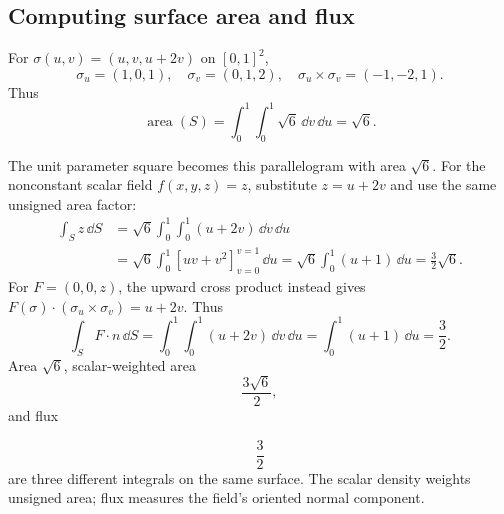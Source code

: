 \subsection{Computing surface area and flux}
\begin{center}
\end{center}
\begin{example}
For $\sigma(u,v)=(u,v,u+2v)$ on $[0,1]^2$,
\[
\sigma_u=(1,0,1),\quad \sigma_v=(0,1,2),\quad
\sigma_u\times\sigma_v=(-1,-2,1).
\]
Thus
\[
\operatorname{area}(S)=\int_0^1\int_0^1\sqrt6\,\dd v\,\dd u=\sqrt6.
\]

\begin{center}
\end{center}
The unit parameter square becomes this parallelogram with area $\sqrt6$.
For the nonconstant scalar field $f(x,y,z)=z$, substitute $z=u+2v$ and
use the same unsigned area factor:
\begin{align*}
\int_S z\,\dd S
&=\sqrt6\int_0^1\int_0^1(u+2v)\,\dd v\,\dd u\\
&=\sqrt6\int_0^1[uv+v^2]_{v=0}^{v=1}\,\dd u
=\sqrt6\int_0^1(u+1)\,\dd u=\frac32\sqrt6.
\end{align*}
For $F=(0,0,z)$, the upward cross product instead gives
$F(\sigma)\cdot(\sigma_u\times\sigma_v)=u+2v$. Thus
\[
\int_S F\cdot n\,\dd S=\int_0^1\int_0^1(u+2v)\,\dd v\,\dd u
=\int_0^1(u+1)\,\dd u=\frac32.
\]
Area $\sqrt6$, scalar-weighted area
\[
\frac{3\sqrt6}{2},
\]
 and flux

\[
\frac32
\]
 are
three different integrals on the same surface. The scalar density weights
unsigned area; flux measures the field's oriented normal component.

\end{example}
